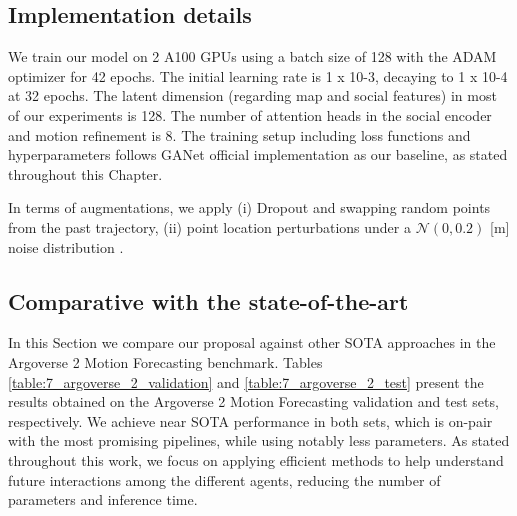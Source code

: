 \subsection{Implementation details}
\label{subsec:7_experimental_results_implementation_details}

We train our model on 2 A100 GPUs using a batch size of 128 with the \ac{ADAM} optimizer for 42 epochs. The initial learning rate is 1 x 10-3, decaying to 1 x 10-4 at 32 epochs. The latent dimension (regarding map and social features) in most of our experiments is 128. The number of attention heads in the social encoder and motion refinement is 8. The training setup including loss functions and hyperparameters follows GANet \cite{wang2022ganet} official implementation as our baseline, as stated throughout this Chapter.

In terms of augmentations, we apply (i) Dropout and swapping random points from the past trajectory, (ii) point location perturbations under a $\mathcal{N}(0, 0.2)$ [m] noise distribution \cite{ye2021tpcn}.

\subsection{Comparative with the state-of-the-art}
\label{subsec:7_experimental_results_comparative_sota}

In this Section we compare our proposal against other \ac{SOTA} approaches in the Argoverse 2 Motion Forecasting benchmark. Tables \ref{table:7_argoverse_2_validation} and \ref{table:7_argoverse_2_test} present the results obtained on the Argoverse 2 Motion Forecasting validation and test sets, respectively. We achieve near \ac{SOTA} performance in both sets, which is on-pair with the most promising pipelines, while using notably less parameters. As stated throughout this work, we focus on applying efficient methods to help understand future interactions among the different agents, reducing the number of parameters and inference time. 


